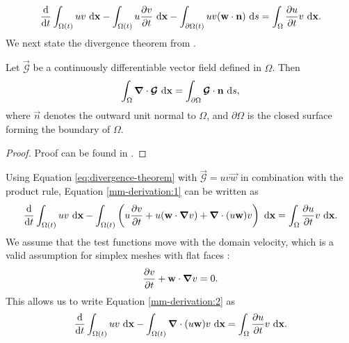         \begin{equation}
            \dv{}{t} \int_{\Omega(t)} uv ~\mathrm{d}\boldsymbol{\mathbf{x}} - \int_{\Omega(t)} u\pdv{v}{t} ~\mathrm{d}\boldsymbol{\mathbf{x}} - \int_{\partial\Omega(t)} uv (\boldsymbol{\mathbf{w}} \cdot \boldsymbol{\mathbf{n}}) ~\mathrm{d} s = \int_\Omega \pdv{u}{t} v ~\mathrm{d} \boldsymbol{\mathbf{x}}.
            \label{mm-derivation:1}
        \end{equation}
        We next state the divergence theorem from \citeauthor{matthewsVectorCalculus} \cite{matthewsVectorCalculus}.
        \begin{theorem}
            Let $\vec{\mathcal{G}}$ be a continuously differentiable vector field defined in $\Omega$. Then
            \begin{equation}
                \int_{\Omega} \boldsymbol{\mathbf{\nabla}} \cdot \boldsymbol{\mathbf{\mathcal{G}}} ~\mathrm{d}\boldsymbol{\mathbf{x}} = \int_{\partial\Omega} \boldsymbol{\mathbf{\mathcal{G}}} \cdot \boldsymbol{\mathbf{n}} ~\mathrm{d} s,
                \label{eq:divergence-theorem}
            \end{equation}
            where $\vec{n}$ denotes the outward unit normal to $\Omega$, and $\partial\Omega$ is the closed surface forming the boundary of $\Omega$.
        \end{theorem}
        \begin{proof}
            Proof can be found in \citeauthor{matthewsVectorCalculus} \cite{matthewsVectorCalculus}.
        \end{proof}\noindent
        Using Equation \eqref{eq:divergence-theorem} with $\vec{\mathcal{G}} = uv\vec{w}$ in combination with the product rule, Equation \eqref{mm-derivation:1} can be written as
        \begin{equation}
            \dv{}{t} \int_{\Omega(t)} uv ~\mathrm{d}\boldsymbol{\mathbf{x}} - \int_{\Omega(t)} \left( u\pdv{v}{t} + u(\boldsymbol{\mathbf{w}} \cdot \boldsymbol{\mathbf{\nabla}}v) + \boldsymbol{\mathbf{\nabla}} \cdot (u \boldsymbol{\mathbf{w}}) v \right) ~\mathrm{d} \boldsymbol{\mathbf{x}} = \int_\Omega \pdv{u}{t} v ~\mathrm{d} \boldsymbol{\mathbf{x}}.
            \label{mm-derivation:2}
        \end{equation}
        We assume that the test functions move with the domain velocity, which is a valid assumption for simplex meshes with flat faces \cite{nobileStabilityAnalysisArbitrary1999}:
        \begin{equation*}
            \pdv{v}{t} + \boldsymbol{\mathbf{w}} \cdot \boldsymbol{\mathbf{\nabla}}v = 0.
        \end{equation*}
        This allows us to write Equation \eqref{mm-derivation:2} as
        \begin{equation}
            \dv{}{t} \int_{\Omega(t)} uv ~\mathrm{d}\boldsymbol{\mathbf{x}} - \int_{\Omega(t)} \boldsymbol{\mathbf{\nabla}} \cdot (u\boldsymbol{\mathbf{w}}) v ~\mathrm{d} \boldsymbol{\mathbf{x}} = \int_\Omega \pdv{u}{t} v ~\mathrm{d} \boldsymbol{\mathbf{x}}.
            \label{eq:moving-mesh-relation-scalar}
        \end{equation}
